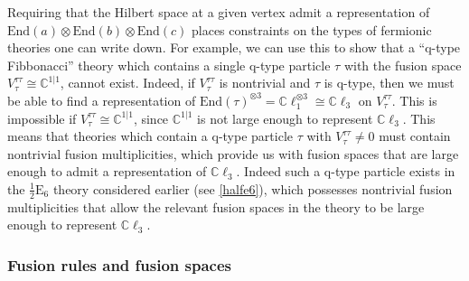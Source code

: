 \documentclass[12pt,a4paper]{article}
\newcommand{\tp}{\otimes}
\newcommand{\cc}{\mathbb{C}}
\newcommand{\End}{\text{End}}
\newcommand{\cl}{\mathbb{C}\ell}
\newcommand{\ethan}[1]{{\color{amethyst}\footnotesize{(EL) #1}}}
\newcommand{\halfesix}{\frac{1}{2}\text{E}_6}
\begin{document}
Requiring that the Hilbert space at a given vertex admit a 
representation of $\End(a)\tp \End(b)\tp \End(c)$ places constraints on the types 
of fermionic theories one can write down. 
For example, we can use this to show that a ``q-type Fibbonacci'' theory 
which contains a single q-type particle $\tau$ with the fusion space $V^{\tau\tau}_{\tau}\cong \cc^{1|1}$, cannot exist. 
Indeed, if $V^{\tau\tau}_{\tau}$ is nontrivial and $\tau$ is q-type, 
then we must be able to find a representation of $\End(\tau)^{\tp 3} = \cl_1^{\tp 3} \cong \cl_3$ on $V^{\tau\tau}_{\tau}$.
This is impossible if $V^{\tau\tau}_{\tau}\cong \cc^{1|1}$, since $\cc^{1|1}$ is not large enough to represent $\cl_3$. 
This means that theories which contain a q-type particle $\tau$ with $V^{\tau\tau}_{\tau}\neq0$ must contain nontrivial 
fusion multiplicities, which provide us with fusion spaces that are large enough to admit a representation of $\cl_3$.
Indeed such a q-type particle exists in the $\halfesix$ theory considered earlier (see \ref{halfe6}), 
which possesses nontrivial fusion multiplicities that allow the relevant fusion spaces in the theory to be large enough to represent $\cl_3$. 






\subsubsection{Fusion rules and fusion spaces} \label{fusion_rules_and_fusion_spaces}
\end{document}
